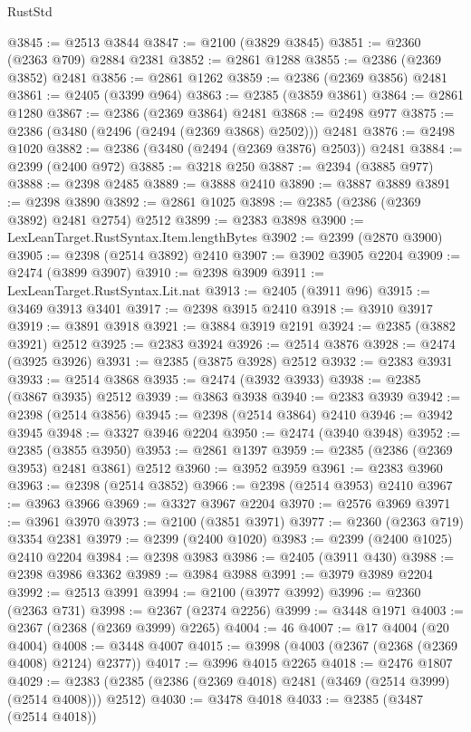 \begin{lexlean}{RustStd}
\begin{coremodule}
{\begin{coremodule}
{{{{{{{{{{{{{{{{{{{{{{{{{{{{{{{{{{{{{{{{{{{{{{{{{{@3845 := @2513 @3844
@3847 := @2100 (@3829 @3845)
@3851 := @2360 (@2363 @709) @2884 @2381
@3852 := @2861 @1288
@3855 := @2386 (@2369 @3852) @2481
@3856 := @2861 @1262
@3859 := @2386 (@2369 @3856) @2481
@3861 := @2405 (@3399 @964)
@3863 := @2385 (@3859 @3861)
@3864 := @2861 @1280
@3867 := @2386 (@2369 @3864) @2481
@3868 := @2498 @977
@3875 := @2386 (@3480 (@2496 (@2494 (@2369 @3868) @2502))) @2481
@3876 := @2498 @1020
@3882 := @2386 (@3480 (@2494 (@2369 @3876) @2503)) @2481
@3884 := @2399 (@2400 @972)
@3885 := @3218 @250
@3887 := @2394 (@3885 @977)
@3888 := @2398 @2485
@3889 := @3888 @2410
@3890 := @3887 @3889
@3891 := @2398 @3890
@3892 := @2861 @1025
@3898 := @2385 (@2386 (@2369 @3892) @2481 @2754) @2512
@3899 := @2383 @3898
@3900 := LexLeanTarget.RustSyntax.Item.lengthBytes
@3902 := @2399 (@2870 @3900)
@3905 := @2398 (@2514 @3892) @2410
@3907 := @3902 @3905 @2204
@3909 := @2474 (@3899 @3907)
@3910 := @2398 @3909
@3911 := LexLeanTarget.RustSyntax.Lit.nat
@3913 := @2405 (@3911 @96)
@3915 := @3469 @3913 @3401
@3917 := @2398 @3915 @2410
@3918 := @3910 @3917
@3919 := @3891 @3918
@3921 := @3884 @3919 @2191
@3924 := @2385 (@3882 @3921) @2512
@3925 := @2383 @3924
@3926 := @2514 @3876
@3928 := @2474 (@3925 @3926)
@3931 := @2385 (@3875 @3928) @2512
@3932 := @2383 @3931
@3933 := @2514 @3868
@3935 := @2474 (@3932 @3933)
@3938 := @2385 (@3867 @3935) @2512
@3939 := @3863 @3938
@3940 := @2383 @3939
@3942 := @2398 (@2514 @3856)
@3945 := @2398 (@2514 @3864) @2410
@3946 := @3942 @3945
@3948 := @3327 @3946 @2204
@3950 := @2474 (@3940 @3948)
@3952 := @2385 (@3855 @3950)
@3953 := @2861 @1397
@3959 := @2385 (@2386 (@2369 @3953) @2481 @3861) @2512
@3960 := @3952 @3959
@3961 := @2383 @3960
@3963 := @2398 (@2514 @3852)
@3966 := @2398 (@2514 @3953) @2410
@3967 := @3963 @3966
@3969 := @3327 @3967 @2204
@3970 := @2576 @3969
@3971 := @3961 @3970
@3973 := @2100 (@3851 @3971)
@3977 := @2360 (@2363 @719) @3354 @2381
@3979 := @2399 (@2400 @1020)
@3983 := @2399 (@2400 @1025) @2410 @2204
@3984 := @2398 @3983
@3986 := @2405 (@3911 @430)
@3988 := @2398 @3986 @3362
@3989 := @3984 @3988
@3991 := @3979 @3989 @2204
@3992 := @2513 @3991
@3994 := @2100 (@3977 @3992)
@3996 := @2360 (@2363 @731)
@3998 := @2367 (@2374 @2256)
@3999 := @3448 @1971
@4003 := @2367 (@2368 (@2369 @3999) @2265)
@4004 := 46
@4007 := @17 @4004 (@20 @4004)
@4008 := @3448 @4007
@4015 := @3998 (@4003 (@2367 (@2368 (@2369 @4008) @2124) @2377))
@4017 := @3996 @4015 @2265
@4018 := @2476 @1807
@4029 := @2383 (@2385 (@2386 (@2369 @4018) @2481 (@3469 (@2514 @3999) (@2514 @4008))) @2512)
@4030 := @3478 @4018
@4033 := @2385 (@3487 (@2514 @4018))
}}}}}}}}}}}}}}}}}}}}}}}}}}}}}}}}}}}}}}}}}}}}}}}}}}
\end{coremodule}}
\end{coremodule}
\end{lexlean}

